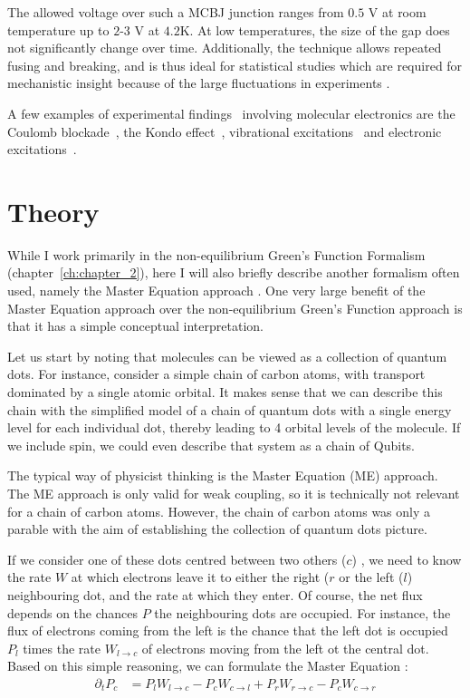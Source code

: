 The allowed voltage over such a MCBJ junction ranges from $0.5$ V at room temperature up to $2$-$3$ V at $4.2$K. At low temperatures, the size of the gap does not significantly change over time. Additionally, the technique allows repeated fusing and breaking, and is thus ideal for statistical studies which are required for mechanistic insight because of the large fluctuations in experiments \cite{ratnerrev2013}.

A few examples of experimental findings~\cite{koole} involving molecular electronics are the Coulomb blockade~\cite{Park2000, Park2002}, the Kondo effect~\cite{Park2002}, vibrational excitations~\cite{vib1, vib2} and electronic excitations~\cite{elec1}.

\section{Theory}
\label{sec:theoryintro}
While I work primarily in the non-equilibrium Green's Function Formalism (chapter~\ref{ch:chapter_2}), here I will also briefly describe another formalism often used, namely the Master Equation approach \cite{seldenthuis}. One very large benefit of the Master Equation approach over the non-equilibrium Green's Function approach is that it has a simple conceptual interpretation.

Let us start by noting that molecules can be viewed as a collection of quantum dots. For instance, consider a simple chain of carbon atoms, with transport dominated by a single atomic orbital. It makes sense that we can describe this chain with the simplified model of a chain of quantum dots with a single energy level for each individual dot, thereby leading to 4 orbital levels of the molecule. If we include spin, we could even describe that system as a chain of Qubits.

The typical way of physicist thinking is the Master Equation (ME) approach. The ME approach is only valid for weak coupling, so it is technically not relevant for a chain of carbon atoms. However, the chain of carbon atoms was only a parable with the aim of establishing the collection of quantum dots picture.

If we consider one of these dots centred between two others ($c$) , we need to know the rate $W$ at which electrons leave it to either the right ($r$ or the left ($l$) neighbouring dot, and the rate at which they enter. Of course, the net flux depends on the chances $P$ the neighbouring dots are occupied. For instance, the flux of electrons coming from the left is the chance that the left dot is occupied $P_l$ times the rate $W_{l\rightarrow c}$ of electrons moving from the left ot the central dot. Based on this simple reasoning, we can formulate the Master Equation \cite{beenakker}:
\begin{align*}
\partial_t P_c &= P_l W_{l\rightarrow c} - P_c W_{c\rightarrow l} + P_r  W_{r\rightarrow c} - P_c W_{c\rightarrow r}
\end{align*}


